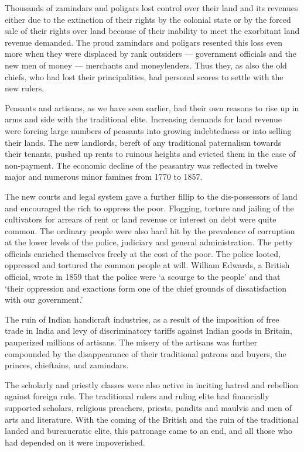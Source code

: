 \begin{multicols}{2}
Thousands of zamindars and poligars lost control over their land and its revenues either due to the extinction of their rights by the colonial state or by the forced sale of their rights over land because of their inability to meet the exorbitant land revenue demanded. The proud zamindars and poligars resented this loss even more when they were displaced by rank outsiders --- government officials and the new men of money --- merchants and moneylenders. Thus they, as also the old chiefs, who had lost their principalities, had personal scores to settle with the new rulers.

Peasants and artisans, as we have seen earlier, had their own reasons to rise up in arms and side with the traditional elite. Increasing demands for land revenue were forcing large numbers of peasants into growing indebtedness or into selling their lands. The new landlords, bereft of any traditional paternalism towards their tenants, pushed up rents to ruinous heights and evicted them in the case of non-payment. The economic decline of the peasantry was reflected in twelve major and numerous minor famines from 1770 to 1857.

The new courts and legal system gave a further fillip to the dis-possessors of land and encouraged the rich to oppress the poor. Flogging, torture and jailing of the cultivators for arrears of rent or land revenue or interest on debt were quite common. The ordinary people were also hard hit by the prevalence of corruption at the lower levels of the police, judiciary and general administration. The petty officials enriched themselves freely at the cost of the poor. The police looted, oppressed and tortured the common people at will. William Edwards, a British official, wrote in 1859 that the police were `a scourge to the people' and that `their oppression and exactions form one of the chief grounds of dissatisfaction with our government.'

The ruin of Indian handicraft industries, as a result of the imposition of free trade in India and levy of discriminatory tariffs against Indian goods in Britain, pauperized millions of artisans. The misery of the artisans was further compounded by the disappearance of their traditional patrons and buyers, the princes, chieftains, and zamindars.

The scholarly and priestly classes were also active in inciting hatred and rebellion against foreign rule. The traditional rulers and ruling elite had financially supported scholars, religious preachers, priests, pandits and maulvis and men of arts and literature. With the coming of the British and the ruin of the traditional landed and bureaucratic elite, this patronage came to an end, and all those who had depended on it were impoverished.


\end{multicols}
